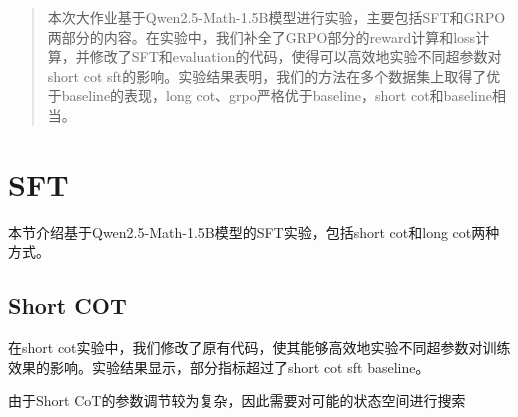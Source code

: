 \documentclass[12pt,hyperref,a4paper,UTF8]{ctexart}
\begin{document}
	
	\cover
	
	\begin{abstract}
	
	本次大作业基于Qwen2.5-Math-1.5B模型进行实验，主要包括SFT和GRPO两部分的内容。在实验中，我们补全了GRPO部分的reward计算和loss计算，并修改了SFT和evaluation的代码，使得可以高效地实验不同超参数对short cot sft的影响。实验结果表明，我们的方法在多个数据集上取得了优于baseline的表现，long cot、grpo严格优于baseline，short cot和baseline相当。
	
	\end{abstract}
	
	\thispagestyle{empty} %
	
	\newpage
	\tableofcontents
	
	\newpage
	\section{SFT}
	本节介绍基于Qwen2.5-Math-1.5B模型的SFT实验，包括short cot和long cot两种方式。
	
	\subsection{Short COT}
	在short cot实验中，我们修改了原有代码，使其能够高效地实验不同超参数对训练效果的影响。实验结果显示，部分指标超过了short cot sft baseline。
	
	由于Short CoT的参数调节较为复杂，因此需要对可能的状态空间进行搜索
	
\end{document}
